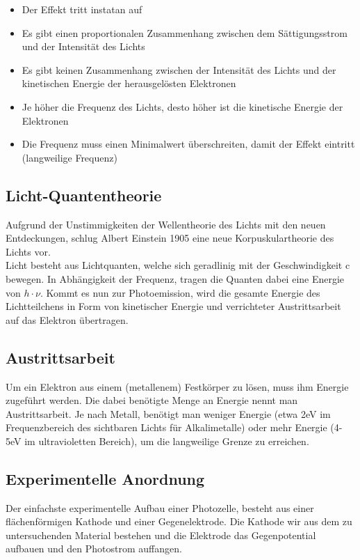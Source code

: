 \documentclass{article}
\begin{document}
\begin{itemize}
\item Der Effekt tritt instatan auf
\item Es gibt einen proportionalen Zusammenhang zwischen dem Sättigungsstrom und der Intensität des Lichts
\item Es gibt keinen Zusammenhang zwischen der Intensität des Lichts und der kinetischen Energie der herausgelösten Elektronen
\item Je höher die Frequenz des Lichts, desto höher ist die kinetische Energie der Elektronen
\item Die Frequenz muss einen Minimalwert überschreiten, damit der Effekt eintritt (langweilige Frequenz)
\end{itemize}

\subsection{Licht-Quantentheorie}
Aufgrund der Unstimmigkeiten der Wellentheorie des Lichts mit den neuen Entdeckungen, schlug Albert Einstein 1905 eine neue Korpuskulartheorie des Lichts vor.\\
Licht besteht aus Lichtquanten, welche sich geradlinig mit der Geschwindigkeit c bewegen. In Abhängigkeit der Frequenz, tragen die Quanten dabei eine Energie von \(h\cdot \nu\). Kommt es nun zur Photoemission, wird die gesamte Energie des Lichtteilchens in Form von kinetischer Energie und verrichteter Austrittsarbeit auf das Elektron übertragen. 

\subsection{Austrittsarbeit}
Um ein Elektron aus einem (metallenem) Festkörper zu lösen, muss ihm Energie zugeführt werden. Die dabei benötigte Menge an Energie nennt man Austrittsarbeit. Je nach Metall, benötigt man weniger Energie (etwa 2eV im Frequenzbereich des sichtbaren Lichts für Alkalimetalle) oder mehr Energie (4-5eV im ultravioletten Bereich), um die langweilige Grenze zu erreichen. 

\subsection{Experimentelle Anordnung}
Der einfachste experimentelle Aufbau einer Photozelle, besteht aus einer flächenförmigen Kathode und einer Gegenelektrode. Die Kathode wir aus dem zu untersuchenden Material bestehen und die Elektrode das Gegenpotential aufbauen und den Photostrom auffangen.
\end{document}
